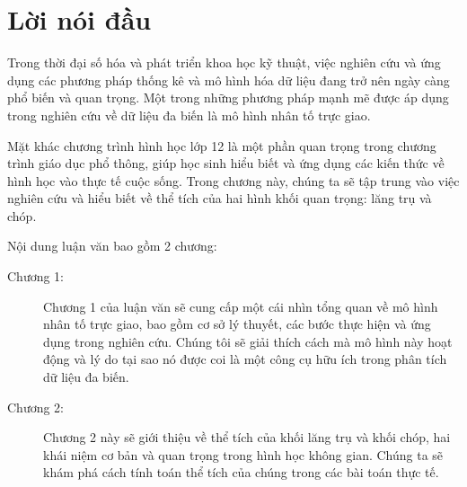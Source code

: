 \chapter*{Lời nói đầu}
Trong thời đại số hóa và phát triển khoa học kỹ thuật, việc nghiên cứu và ứng dụng các phương pháp thống kê và mô hình hóa dữ liệu đang trở nên ngày càng phổ biến và quan trọng. Một trong những phương pháp mạnh mẽ được áp dụng trong nghiên cứu về dữ liệu đa biến là mô hình nhân tố trực giao.

Mặt khác chương trình hình học lớp 12 là một phần quan trọng trong chương trình giáo dục phổ thông, giúp học sinh hiểu biết và ứng dụng các kiến thức về hình học vào thực tế cuộc sống. Trong chương này, chúng ta sẽ tập trung vào việc nghiên cứu và hiểu biết về thể tích của hai hình khối quan trọng: lăng trụ và chóp.

Nội dung luận văn bao gồm 2 chương:

\begin{description}
\item [Chương 1:] Chương 1 của luận văn sẽ cung cấp một cái nhìn tổng quan về mô hình nhân tố trực giao, bao gồm cơ sở lý thuyết, các bước thực hiện và ứng dụng trong nghiên cứu. Chúng tôi sẽ giải thích cách mà mô hình này hoạt động và lý do tại sao nó được coi là một công cụ hữu ích trong phân tích dữ liệu đa biến.
\item [Chương 2:] 
Chương 2 này sẽ giới thiệu về thể tích của khối lăng trụ và khối chóp, hai khái niệm cơ bản và quan trọng trong hình học không gian. Chúng ta sẽ khám phá cách tính toán thể tích của chúng trong các bài toán thực tế.
\end{description}

